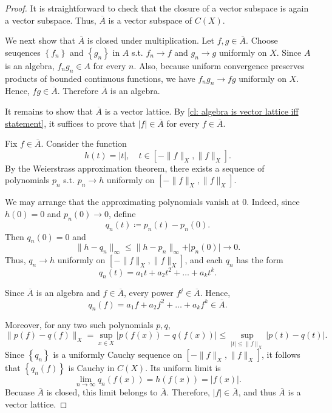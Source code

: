 \begin{proof}
    It is straightforward to check that the closure of a vector subspace is again a vector subspace. Thus, \(\overline{A}\) is a vector subspace of \(C(X)\). 

    We next show that \(\overline{A} \) is closed under multiplication. Let \(f, g \in \overline{A}\). Choose seuqences \(\left\{ f_n \right\} \) and \(\left\{ g_n \right\} \) in \(A\) s.t. \(f_n \to f\) and \(g_n \to g\) uniformly on \(X\). Since \(A\) is an algebra, \(f_n g_n \in A\) for every \(n\). Also, because uniform convergence preserves products of bounded continuous functions, we have \(f_n g_n \to fg\) uniformly on \(X\). Hence, \(fg \in \overline{A}\). Therefore \(\overline{A} \) is an algebra. 

    It remains to show that \(\overline{A} \) is a vector lattice. By \autoref{cl: algebra is vector lattice iff statement}, it suffices to prove that \(\vert f \vert \in \overline{A} \) for every \(f \in \overline{A}\). 

    Fix \(f \in \overline{A}\). Consider the function 
    \[
        h(t) = \vert t \vert, \quad t \in \left[ -\lVert f \rVert_X, \lVert f \rVert_X   \right].  
    \]                
    By the Weierstrass approximation theorem, there exists a sequence of polynomials \(p_n\) s.t. \(p_n \to h\) uniformly on \(\left[ -\lVert f \rVert_X, \lVert f \rVert_X   \right] \). 

    We may arrange that the approximating polynomials vanish at \(0\). Indeed, since \(h(0) = 0\) and \(p_n(0) \to 0\), define 
    \[
        q_n(t) \coloneqq p_n(t) - p_n(0).
    \]       
    Then \(q_n(0) = 0\) and 
    \[
        \lVert h - q_n \rVert_\infty \le \lVert h - p_n \rVert_\infty + \vert p_n(0) \vert \to 0.  
    \] 
    Thus, \(q_n \to h\) uniformly on \(\left[ -\lVert f \rVert_X, \lVert f \rVert_X   \right] \), and each \(q_n\) has the form 
    \[
        q_n(t) = a_1 t + a_2 t^2 + \dots + a_k t^k.
    \]   

    Since \(\overline{A} \) is an algebra and \(f \in \overline{A}\), every power \(f^j \in \overline{A}\). Hence, 
    \[
        q_n(f) = a_1 f + a_2 f^2 + \dots + a_k f^k \in \overline{A}.
    \]   

    Moreover, for any two such polynomials \(p, q\),
    \[
        \lVert p(f) - q(f) \rVert_X = \sup _{x \in X} \vert p(f(x)) - q(f(x)) \vert \le \sup _{\vert t \vert \le \lVert f \rVert_X } \vert p(t) - q(t) \vert. 
    \] 
    Since \(\left\{ q_n \right\} \) is a uniformly Cauchy sequence on \(\left[ - \lVert f \rVert_X, \lVert f \rVert_X   \right] \), it follows that \(\left\{ q_n(f) \right\} \) is Cauchy in \(C(X)\). Its uniform limit is 
    \[
        \lim_{n \to \infty} q_n(f(x)) = h(f(x)) = \vert f(x) \vert.  
    \]    
    Becuase \(\overline{A} \) is closed, this limit belongs to \(\overline{A}\). Therefore, \(\vert f \vert \in \overline{A} \), and thus \(\overline{A} \) is a vector lattice.    
\end{proof}